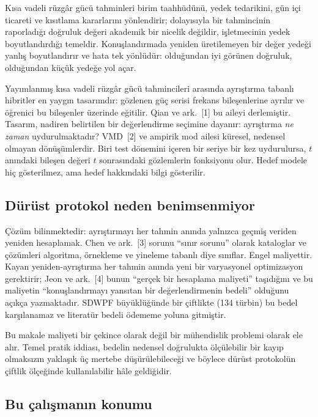 \documentclass[11pt,a4paper]{article}
\begin{document}
Kısa vadeli rüzgâr gücü tahminleri birim taahhüdünü, yedek tedarikini, gün içi
ticareti ve kısıtlama kararlarını yönlendirir; dolayısıyla bir tahmincinin
raporladığı doğruluk değeri akademik bir nicelik değildir, işletmecinin yedek
boyutlandırdığı temeldir. Konuşlandırmada yeniden üretilemeyen bir değer yedeği
yanlış boyutlandırır ve hata tek yönlüdür: olduğundan iyi görünen doğruluk,
olduğundan küçük yedeğe yol açar.

Yayımlanmış kısa vadeli rüzgâr gücü tahmincileri arasında ayrıştırma tabanlı
hibritler en yaygın tasarımdır: gözlenen güç serisi frekans bileşenlerine
ayrılır ve öğrenici bu bileşenler üzerinde eğitilir. Qian ve ark.~[1] bu aileyi
derlemiştir. Tasarım, nadiren belirtilen bir değerlendirme seçimine dayanır:
ayrıştırma \emph{ne zaman} uydurulmaktadır? VMD~[2] ve ampirik mod ailesi
küresel, nedensel olmayan dönüşümlerdir. Biri test dönemini içeren bir seriye
bir kez uydurulursa, $t$ anındaki bileşen değeri $t$ sonrasındaki gözlemlerin
fonksiyonu olur. Hedef modele hiç gösterilmez, ama hedef hakkındaki bilgi
gösterilir.

\subsection{Dürüst protokol neden benimsenmiyor}

Çözüm bilinmektedir: ayrıştırmayı her tahmin anında yalnızca geçmiş veriden
yeniden hesaplamak. Chen ve ark.~[3] sorunu ``sınır sorunu'' olarak kataloglar
ve çözümleri algoritma, örnekleme ve yineleme tabanlı diye sınıflar. Engel
maliyettir. Kayan yeniden-ayrıştırma her tahmin anında yeni bir varyasyonel
optimizasyon gerektirir; Jeon ve ark.~[4] bunun ``gerçek bir hesaplama maliyeti''
taşıdığını ve bu maliyetin ``konuşlandırmayı yansıtan bir değerlendirmenin
bedeli'' olduğunu açıkça yazmaktadır. SDWPF büyüklüğünde bir çiftlikte
(134 türbin) bu bedel karşılanamaz ve literatür bedeli ödememe yoluna gitmiştir.

Bu makale maliyeti bir çekince olarak değil bir mühendislik problemi olarak ele
alır. Temel pratik iddiası, bedelin nedensel doğrulukta ölçülebilir bir kayıp
olmaksızın yaklaşık üç mertebe düşürülebileceği ve böylece dürüst protokolün
çiftlik ölçeğinde kullanılabilir hâle geldiğidir.

\subsection{Bu çalışmanın konumu}
\end{document}
